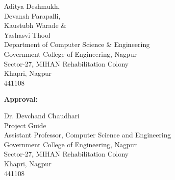 \documentclass[a4paper]{report}
\begin{document}
Aditya Deshmukh,\\ 
Devansh Parapalli,\\ 
Kaustubh Warade \& \\
Yashasvi Thool \\ 
\smallskip 
Department of Computer Science \& Engineering\\Government College of Engineering, Nagpur\\
Sector-27, MIHAN Rehabilitation Colony\\
Khapri, Nagpur\\
441108\\


\newpage

{\large \textbf{Approval:}}

\bigskip
\bigskip
\bigskip
\bigskip

\begin{spacing}{1.5}
Dr. Devchand Chaudhari\\
Project Guide\\
Assistant Professor, Computer Science and Engineering\\
Government College of Engineering, Nagpur\\
Sector-27, MIHAN Rehabilitation Colony\\
Khapri, Nagpur\\
441108\\
\end{spacing}
\end{document}
